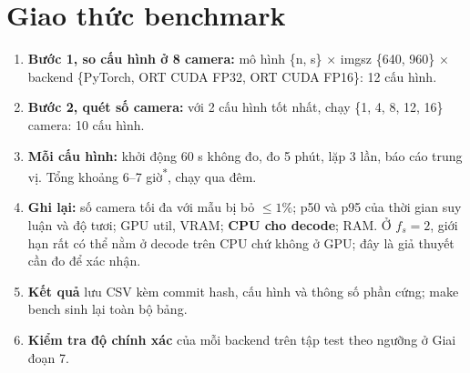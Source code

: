 \documentclass[10pt,a4paper,oneside,openany]{report}
\newcommand{\breakus}{\textunderscore\allowbreak}
\newcommand{\code}[1]{{\ttfamily\let\_\breakus #1}}
\newcommand{\uoc}{\textsuperscript{\textcolor{warn}{*}}}  %
\begin{document}
\section{Giao thức benchmark}\label{sec:benchmark}
\begin{enumerate}
  \item \textbf{Bước 1, so cấu hình ở 8 camera:} mô hình \{n, s\} × \code{imgsz} \{640, 960\} × backend \{PyTorch, ORT CUDA FP32, ORT CUDA FP16\}: 12 cấu hình.
  \item \textbf{Bước 2, quét số camera:} với 2 cấu hình tốt nhất, chạy \{1, 4, 8, 12, 16\} camera: 10 cấu hình.
  \item \textbf{Mỗi cấu hình:} khởi động 60 s không đo, đo 5 phút, lặp 3 lần, báo cáo trung vị. Tổng khoảng 6--7 giờ\uoc, chạy qua đêm.
  \item \textbf{Ghi lại:} số camera tối đa với mẫu bị bỏ $\le 1\%$; p50 và p95 của thời gian suy luận và độ tươi; GPU util, VRAM; \textbf{CPU cho decode};
        RAM. Ở $f_s = 2$, giới hạn rất có thể nằm ở decode trên CPU chứ không ở GPU; đây là giả thuyết cần đo để xác nhận.
  \item \textbf{Kết quả} lưu CSV kèm commit hash, cấu hình và thông số phần cứng; \code{make bench} sinh lại toàn bộ bảng.
  \item \textbf{Kiểm tra độ chính xác} của mỗi backend trên tập test theo ngưỡng ở Giai đoạn 7.
\end{enumerate}
\end{document}
